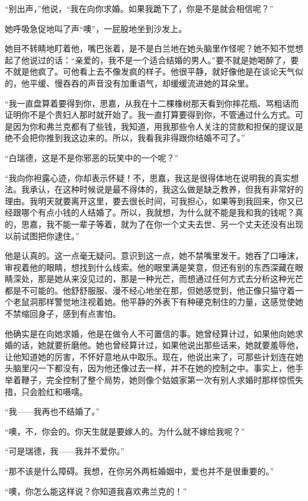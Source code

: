 \par “别出声，”他说，“我在向你求婚。如果我跪下了，你是不是就会相信呢？”
\par 她呼吸急促地叫了声“噢”，一屁股地坐到沙发上。
\par 她目不转睛地盯着他，嘴巴张着，是不是白兰地在她头脑里作怪呢？她不知不觉想起了他说过的话：“亲爱的，我不是一个适合结婚的男人。”要不就是她喝醉了，要不就是他疯了。可他看上去不像发疯的样子。他很平静，就好像他是在谈论天气似的，他平缓、慢吞吞的声音没有加重语气，却缓缓流进她的耳朵里。
\par “我一直盘算着要得到你，思嘉，从我在十二棵橡树那天看到你摔花瓶、骂粗话而证明你不是个贵妇人那时就开始了。我一直打算要得到你，不管通过什么方式。可是因为你和弗兰克都有了些钱，我知道，用我那些令人关注的贷款和担保的提议是绝不会把你推到我这边来的。所以，我看我非得跟你结婚不可了。”
\par “白瑞德，这是不是你邪恶的玩笑中的一个呢？”
\par “我向你袒露心迹，你却表示怀疑！不，思嘉，我这是很得体地在说明我的真实想法。我承认，在这种时候说是最不得体的，我这么做是缺乏教养，但我有非常好的理由。我明天就要离开这里，要去很长时间，可我担心，如果等到我回来，你又已经跟哪个有点小钱的人结婚了。所以，我就想，为什么就不能是我和我的钱呢？真的，思嘉，我不能一辈子等着，就为了在你一个丈夫去世、另一个丈夫还没有出现以前试图把你逮住。”
\par 他是认真的。这一点毫无疑问。意识到这一点，她不禁嘴里发干。她吞了口唾沫，审视着他的眼睛，想找到什么线索。他的眼里满是笑意，但还有别的东西深藏在眼睛深处，那是她从来没见过的，那是一种光芒，而想通过任何方式去分析这种光芒都是不可能的。他舒舒服服、漫不经心地坐在那，但她感觉到，他正像只猫守着一个老鼠洞那样警觉地注视着她。他平静的外表下有种硬克制住的力量，这感觉使她不禁缩回身子，感到有点害怕。
\par 他确实是在向她求婚，他是在做令人不可置信的事。她曾经算计过，如果他向她求婚的话，她就要折磨他。她也曾经算计过，如果他说出那些话来，她就要羞辱他，让他知道她的厉害，不怀好意地从中取乐。现在，他说出来了，可那些计划连在她头脑里闪一下都没有，因为他还像过去一样，并不在她的控制之中。事实上，他手举着鞭子，完全控制了整个局势，她则像个姑娘家第一次有别人求婚时那样惊慌失措，只会脸红和嗫嚅。
\par “我——我再也不结婚了。”
\par “噢，不，你会的。你天生就是要嫁人的。为什么就不嫁给我呢？”
\par “可是瑞德，我——我并不爱你。”
\par “那不该是什么障碍。我想，在你另外两桩婚姻中，爱也并不是很重要的。”
\par “噢，你怎么能这样说？你知道我喜欢弗兰克的！”
